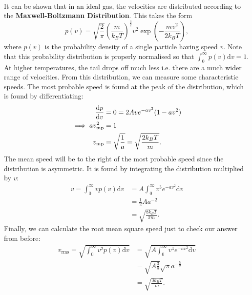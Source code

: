 \documentclass[../thermodynamics.tex]{subfiles}
\begin{document}
        \paragraph{}
        It can be shown that in an ideal gas, the velocities are distributed according to the \textbf{Maxwell-Boltzmann Distribution}.
        This takes the form
        \begin{equation}
            p(v)=\sqrt{\frac{2}{\pi}}\left(\frac{m}{k_BT}\right)^\frac{3}{2}v^2\exp\left(-\frac{mv^2}{2k_BT}\right),
        \end{equation}
        where $p(v)$ is the probability density of a single particle having speed $v$.
        Note that this probability distribution is properly normalised so that $\int_{0}^{\infty}p(v)\mathrm{d}v=1$.
        At higher temperatures, the tail drops off much less i.e. there are a much wider range of velocities.
        From this distribution, we can measure some characteristic speeds.
        The most probable speed is found at the peak of the distribution, which is found by differentiating:
        \begin{align}
            \frac{\mathrm{d}p}{\mathrm{d}v}&=0=2Ave^{-av^2}(1-av^2)\\
            \implies av_\text{mp}^2&=1\\
            v_\text{mp}&=\sqrt{\frac{1}{a}}=\sqrt{\frac{2k_BT}{m}}.
        \end{align}
        The mean speed will be to the right of the most probable speed since the distribution is asymmetric.
        It is found by integrating the distribution multiplied by $v$:
        \begin{align}
            \bar{v}=\int_{0}^{\infty}vp(v)\mathrm{d}v&=A\int_{0}^{\infty}v^3e^{-av^2}\mathrm{d}v\\
            &=\frac{1}{2}Aa^{-2}\\
            &=\sqrt{\frac{8k_BT}{\pi m}}.
        \end{align}
        Finally, we can calculate the root mean square speed just to check our answer from before:
        \begin{align}
            v_\text{rms}=\sqrt{\int_{0}^{\infty}v^2p(v)\mathrm{d}v}&=\sqrt{A\int_{0}^{\infty}v^4e^{-av^2}\mathrm{d}v}\\
            &=\sqrt{A\frac{3}{8}}\sqrt{\pi}a^{-\frac{5}{2}}\\
            &=\sqrt{\frac{3k_BT}{m}}.
        \end{align}
\end{document}
